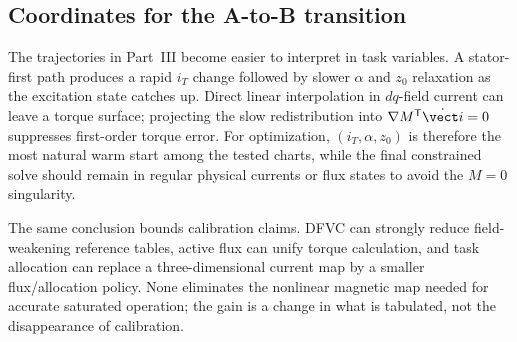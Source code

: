 \subsection{Coordinates for the A-to-B transition}

The trajectories in Part~III become easier to interpret in task variables.
A stator-first path produces a rapid \(i_T\) change followed by slower
\(\alpha\) and \(z_0\) relaxation as the excitation state catches up. Direct
linear interpolation in \(dq\)-field current can leave a torque surface;
projecting the slow redistribution into
\(\nabla M^{\mathsf T}\dot{\vect i}=0\) suppresses first-order torque error.
For optimization, \((i_T,\alpha,z_0)\) is therefore the most natural warm
start among the tested charts, while the final constrained solve should remain
in regular physical currents or flux states to avoid the \(M=0\) singularity.

The same conclusion bounds calibration claims. DFVC can strongly reduce
field-weakening reference tables, active flux can unify torque calculation,
and task allocation can replace a three-dimensional current map by a smaller
flux/allocation policy. None eliminates the nonlinear magnetic map needed for
accurate saturated operation; the gain is a change in what is tabulated, not
the disappearance of calibration.

